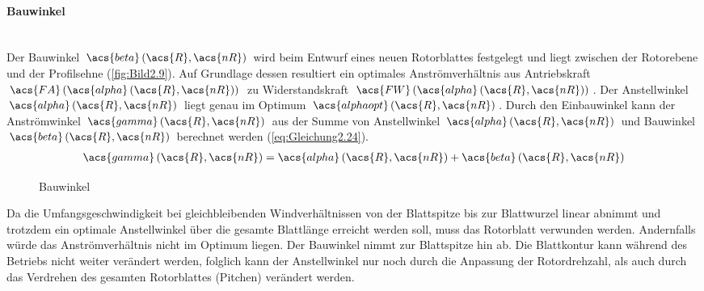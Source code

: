 \paragraph{Bauwinkel}\mbox{}\smallskip\\
Der Bauwinkel $\acs{beta}\left(\acs{R}, \acs{nR}\right)$ wird beim Entwurf eines neuen Rotorblattes festgelegt und liegt zwischen der Rotorebene und der Profilsehne (\autoref{fig:Bild2.9}). Auf Grundlage dessen resultiert ein optimales Anströmverhältnis aus Antriebskraft $\acs{FA}\left(\acs{alpha}\left(\acs{R}, \acs{nR}\right)\right)$ zu Widerstandskraft $\acs{FW}\left(\acs{alpha}\left(\acs{R}, \acs{nR}\right)\right)$. Der Anstellwinkel $\acs{alpha}\left(\acs{R}, \acs{nR}\right)$ liegt genau im Optimum $\acs{alphaopt}\left(\acs{R}, \acs{nR}\right)$. Durch den Einbauwinkel kann der Anströmwinkel $\acs{gamma}\left(\acs{R}, \acs{nR}\right)$ aus der Summe von Anstellwinkel $\acs{alpha}\left(\acs{R}, \acs{nR}\right)$ und Bauwinkel $\acs{beta}\left(\acs{R}, \acs{nR}\right)$ berechnet werden (\autoref{eq:Gleichung2.24}).
\begin{align} \label{eq:Gleichung2.24}
	\acs{gamma}\left(\acs{R}, \acs{nR}\right) = \acs{alpha}\left(\acs{R}, \acs{nR}\right) + \acs{beta}\left(\acs{R}, \acs{nR}\right)
\end{align}
\begin{figure}[H]
   \centering
   \caption[Bauwinkel]{Bauwinkel}
   \label{fig:Bild2.9}
\end{figure}

Da die Umfangsgeschwindigkeit bei gleichbleibenden Windverhältnissen von der Blattspitze bis zur Blattwurzel linear abnimmt und trotzdem ein optimale Anstellwinkel über die gesamte Blattlänge erreicht werden soll, muss das Rotorblatt verwunden werden. Andernfalls würde das Anströmverhältnis nicht im Optimum liegen. Der Bauwinkel nimmt zur Blattspitze hin ab. Die Blattkontur kann während des Betriebs nicht weiter verändert werden, folglich kann der Anstellwinkel nur noch durch die Anpassung der Rotordrehzahl, als auch durch das Verdrehen des gesamten Rotorblattes (Pitchen) verändert werden.

